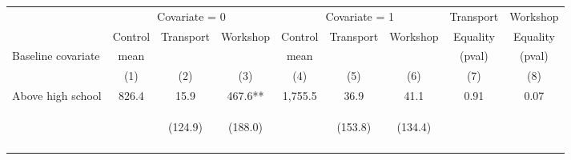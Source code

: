\begin{tabular}{lcccccccc}
\hline \noalign{\smallskip} & \multicolumn{3}{c}{Covariate = 0} & \multicolumn{3}{c}{Covariate = 1} & Transport & Workshop\\
\cmidrule(lr){2-4}\cmidrule(lr){5-7}\cmidrule(lr){8-9} & Control & {Transport} & {Workshop} & Control & {Transport} & {Workshop} & {Equality} & {Equality}\\
Baseline covariate & mean &  &  & mean &  &  & (pval) & (pval)\\
 & (1) & (2) & (3) & (4) & (5) & (6) & (7) & (8)\\
\noalign{\smallskip}\hline \noalign{\smallskip}Above high school & 826.4 & 15.9 & 467.6** & 1,755.5 & 36.9 & 41.1 & 0.91 & 0.07\\
 & \begin{footnotesize}\end{footnotesize} & \begin{footnotesize}(124.9)\end{footnotesize} & \begin{footnotesize}(188.0)\end{footnotesize} & \begin{footnotesize}\end{footnotesize} & \begin{footnotesize}(153.8)\end{footnotesize} & \begin{footnotesize}(134.4)\end{footnotesize} & \begin{footnotesize}\end{footnotesize} & \begin{footnotesize}\end{footnotesize}\\
 & \begin{footnotesize}\end{footnotesize} & \begin{footnotesize}[1.000]\end{footnotesize} & \begin{footnotesize}[0.036]\end{footnotesize} & \begin{footnotesize}\end{footnotesize} & \begin{footnotesize}[1.000]\end{footnotesize} & \begin{footnotesize}[0.839]\end{footnotesize} & \begin{footnotesize}\end{footnotesize} & \begin{footnotesize}\end{footnotesize}\\

\end{tabular}
